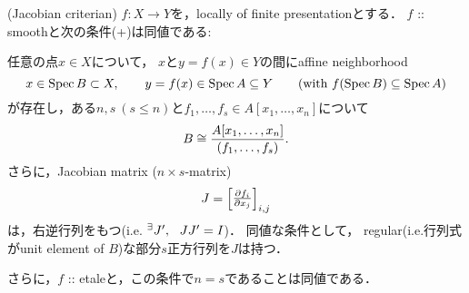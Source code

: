 \documentclass[a4paper]{jsarticle}
\begin{document}
\begin{Prop}(Jacobian criterian) \label{prop:jac_cri}
    $f \colon X \to Y$を，locally of finite presentationとする．
    $f$ :: smoothと次の条件(+)は同値である:
    
    任意の点$x \in X$について，
    $x$と$y=f(x) \in Y$の間にaffine neighborhood
    \[
        x \in \operatorname{Spec} B \subset X, \qquad y=f(x) \in \operatorname{Spec} A \subseteq Y
        \qquad (\text{with  }f(\operatorname{Spec} B) \subseteq \operatorname{Spec} A)
    \]
    が存在し，ある$n, s\ (s \leq n)$と$f_1, \dots, f_s \in A[x_1, \dots, x_n]$について
    \[ B \cong \frac{A[x_1, \dots, x_n]}{(f_1, \dots, f_s)}. \]
    さらに，Jacobian matrix ($n \times s$-matrix)
    \[ J=\begin{bmatrix} \frac{\partial f_i}{\partial x_j} \end{bmatrix}_{i, j} \]
    は，右逆行列をもつ(i.e. ${}^{\exists} J',~~ JJ'=I$)．
    同値な条件として，
    regular(i.e.行列式がunit element of $B$)な部分$s$正方行列を$J$は持つ．

    さらに，$f$ :: etaleと，この条件で$n=s$であることは同値である．
\end{Prop}
\end{document}
